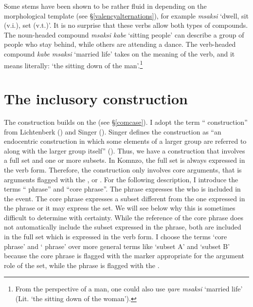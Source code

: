 Some stems have been shown to be rather fluid in  depending on the morphological template (see \S{}\ref{valencyalternations}), for example \emph{msaksi} `dwell, sit (v.i.), set (v.t.)'. It is no surprise that these verbs allow both types of compounds. The noun-headed compound \emph{msaksi kabe} `sitting people' can describe a group of people who stay behind, while others are attending a dance. The verb-headed compound \emph{kabe msaksi} `married life' takes on the  meaning of the verb, and it means literally: `the sitting down of the man'.\footnote{From the perspective of a man, one could also use \emph{ŋare msaksi} `married life' (Lit. `the sitting down of the woman').}

\section{The inclusory construction}\label{inclusorycontruction}

The  construction builds on the   (see \S{}\ref{comcase}). I adopt the term `` construction'' from Lichtenberk (\citeyear{Lichtenberk:2000hr}) and Singer (\citeyear{Singer:inclu}). Singer defines the  construction as ``an endocentric construction in which some elements of a larger group are referred to along with the larger group itself'' (\citeyear[1]{Singer:inclu}). Thus, we have a construction that involves a full set and one or more subsets. In Komnzo, the full set is always expressed in the verb form. Therefore, the  construction only involves core arguments, that is arguments flagged with the ,  or  . For the following description, I introduce the terms `` phrase'' and ``core phrase''. The  phrase expresses the  who is included in the event. The core phrase expresses a subset different from the one expressed in the  phrase or it may express the set. We will see below why this is sometimes difficult to determine with certainty. While the reference of the core phrase does not automatically include the subset expressed in the  phrase, both are included in the full set which is expressed in the verb form. I choose the terms `core phrase' and ` phrase' over more general terms like `subset A' and `subset B' because the core phrase is flagged with the  marker appropriate for the argument role of the set, while the  phrase is flagged with the  .%

